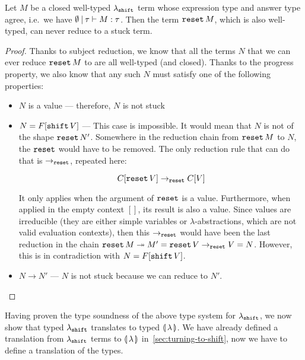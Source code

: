 \begin{property}

  Let $M$ be a closed well-typed $\lambda_{\mathtt{shift}}$ term whose expression
  type and answer type agree, i.e.\ we have $\emptyset \mathbin{|} \tau \vdash M
  : \tau$. Then the term $\mathtt{reset}\,M$, which is also well-typed, can
  never reduce to a stuck term.
\end{property}
\begin{proof}
  Thanks to subject reduction, we know that all the terms $N$ that we can
  ever reduce $\mathtt{reset}\,M$ to are all well-typed (and closed). Thanks
  to the progress property, we also know that any such $N$ must satisfy one
  of the following properties:
  \begin{itemize}
  \item $N$ is a value --- therefore, $N$ is not stuck
  \item $N = F[\mathtt{shift}\,V]$ --- This case is impossible. It would mean
    that $N$ is not of the shape $\mathtt{reset}\,N'$. Somewhere in the
    reduction chain from $\mathtt{reset}\,M$ to $N$, the $\mathtt{reset}$ would have
    to be removed. The only reduction rule that can do that is
    $\to_{\mathtt{reset}}$, repeated here:

    $$
    C[\mathtt{reset}\,V] \to_{\mathtt{reset}} C[V]
    $$

    It only applies when the argument of $\mathtt{reset}$ is a value. Furthermore,
    when applied in the empty context $[]$, its result is also a
    value. Since values are irreducible (they are either simple variables
    or $\lambda$-abstractions, which are not valid evaluation contexts),
    then this $\to_{\mathtt{reset}}$ would have been the last reduction in the chain
    $\mathtt{reset}\,M \twoheadrightarrow M' = \mathtt{reset}\,V \to_{\mathtt{reset}} V = N$. However,
    this is in contradiction with $N = F[\mathtt{shift}\,V]$.
  \item $N \to N'$ --- $N$ is not stuck because we can reduce to $N'$.
  \end{itemize}
\end{proof}

Having proven the type soundness of the above type system for
$\lambda_{\mathtt{shift}}$, we now show that typed $\lambda_{\mathtt{shift}}$ translates to
typed $\llparenthesis \, \lambda \, \rrparenthesis$. We have already defined a translation from
$\lambda_{\mathtt{shift}}$ terms to $\llparenthesis \, \lambda \, \rrparenthesis$ in~\ref{sec:turning-to-shift},
now we have to define a translation of the types.

